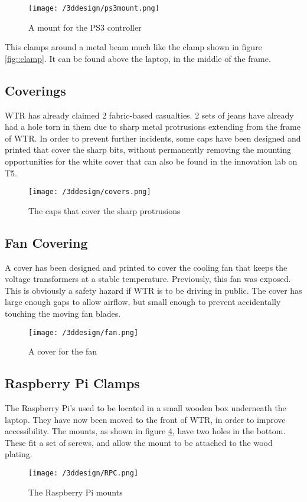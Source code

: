 \begin{figure}[H]
\centering
\texttt{[image: /3ddesign/ps3mount.png]}
\caption{A mount for the PS3 controller}
\label{fig::PS3}
\end{figure}

This clamps around a metal beam much like the clamp shown in figure \ref{fig::clamp}.
It can be found above the laptop, in the middle of the frame.

\subsection{Coverings}
WTR has already claimed 2 fabric-based casualties.
2 sets of jeans have already had a hole torn in them due to sharp metal protrusions extending from the frame of WTR.
In order to prevent further incidents, some caps have been designed and printed that cover the sharp bits, without permanently removing the mounting opportunities for the white cover that can also be found in the innovation lab on T5.


\begin{figure}[H]
\centering
\texttt{[image: /3ddesign/covers.png]}
\caption{The caps that cover the sharp protrusions}
\label{fig::CAP}
\end{figure}

\subsection{Fan Covering}
A cover has been designed and printed to cover the cooling fan that keeps the voltage transformers at a stable temperature.
Previously, this fan was exposed.
This is obviously a safety hazard if WTR is to be driving in public.
The cover has large enough gaps to allow airflow, but small enough to prevent accidentally touching the moving fan blades.

\begin{figure}[H]
\centering
\texttt{[image: /3ddesign/fan.png]}
\caption{A cover for the fan}
\label{fig::FAN}
\end{figure}

\subsection{Raspberry Pi Clamps}
The Raspberry Pi's used to be located in a small wooden box underneath the laptop.
They have now been moved to the front of WTR, in order to improve accessibility.
The mounts, as shown in figure \ref{fig::RPC}, have two holes in the bottom.
These fit a set of screws, and allow the mount to be attached to the wood plating.

\begin{figure}[H]
\centering
\texttt{[image: /3ddesign/RPC.png]}
\caption{The Raspberry Pi mounts}
\label{fig::RPC}
\end{figure}


\newpage